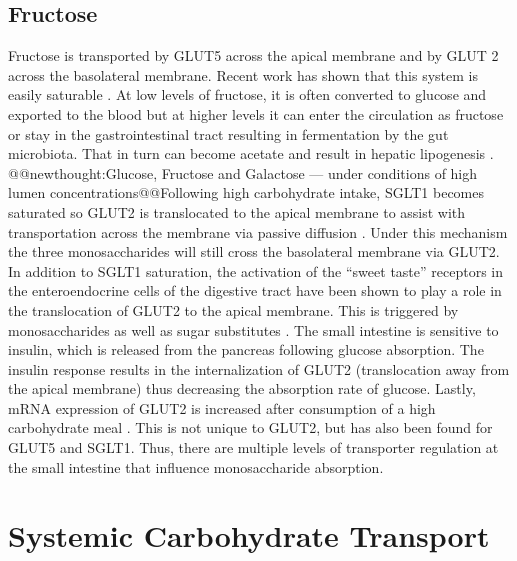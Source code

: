 \documentclass{tufte-handout}
\makeatletter
\def\newthought#1{@@newthought:#1@@}
\makeatother
\begin{document}
\subsection{Fructose}

Fructose is transported by GLUT5 across the apical membrane and by GLUT 2 across the basolateral membrane.  Recent work has shown that this system is easily saturable \citep{Jang2018}.  At low levels of fructose, it is often converted to glucose and exported to the blood but at higher levels it can enter the circulation as fructose or stay in the gastrointestinal tract resulting in fermentation by the gut microbiota.  That in turn can become acetate and result in hepatic lipogenesis \citep{Zhao2020a}.
\newthought{Glucose, Fructose and Galactose --- under conditions of high lumen concentrations}Following high carbohydrate intake, SGLT1 becomes saturated so GLUT2 is translocated to the apical membrane to assist with transportation across the membrane via passive diffusion \citep{Kellett2008}. Under this mechanism the three monosaccharides will still cross the basolateral membrane via GLUT2. In addition to SGLT1 saturation, the activation of the ``sweet taste'' receptors in the enteroendocrine cells of the digestive tract have been shown to play a role in the translocation of GLUT2 to the apical membrane. This is triggered by monosaccharides as well as sugar substitutes \citep{Stearns2010}. The small intestine is sensitive to insulin, which is released from the pancreas following glucose absorption. The insulin response results in the internalization of GLUT2 (translocation away from the apical membrane) thus decreasing the absorption rate of glucose. Lastly, mRNA expression of GLUT2 is increased after consumption of a high carbohydrate meal \citep{Miyamoto1993}. This is not unique to GLUT2, but has also been found for GLUT5 and SGLT1. Thus, there are multiple levels of transporter regulation at the small intestine that influence monosaccharide absorption. 


\section{Systemic Carbohydrate Transport}
\end{document}
